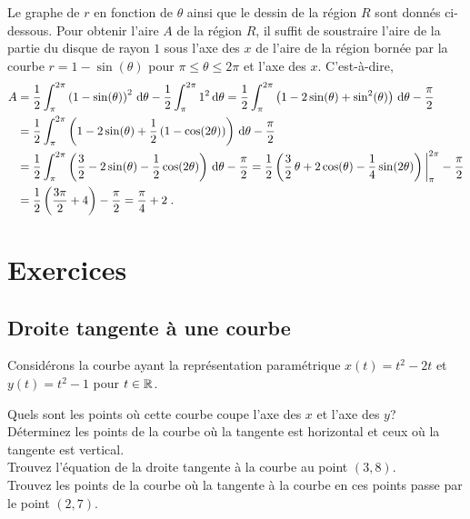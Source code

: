 {\begin{egg}
Le graphe de $r$ en fonction de $\theta$ ainsi que le dessin de la
région $R$ sont donnés ci-dessous.
Pour obtenir l'aire $A$ de la région $R$, il suffit de soustraire
l'aire de la partie du disque de rayon $1$ sous l'axe des $x$ de
l'aire de la région bornée par la courbe $r=1-\sin(\theta)$ pour
$\pi \leq \theta \leq 2\pi$ et l'axe des $x$.  C'est-à-dire,
\begin{align*}
A &= \frac{1}{2} \int_\pi^{2\pi} \left(1-\sin(\theta)\right)^2 \,\mathrm{d}\theta
- \frac{1}{2} \int_\pi^{2\pi} 1^2 \,\mathrm{d}\theta
= \frac{1}{2} \int_\pi^{2\pi} \left(1-2\sin(\theta)+\sin^2(\theta)\right)
\,\mathrm{d}\theta - \frac{\pi}{2} \\
&= \frac{1}{2} \int_\pi^{2\pi} \left(1-2\sin(\theta)+
\frac{1}{2}\left(1-\cos(2\theta)\right)\right) \,\mathrm{d}\theta - \frac{\pi}{2} \\
&= \frac{1}{2} \int_\pi^{2\pi} \left(\frac{3}{2} - 2\sin(\theta) -
\frac{1}{2}\cos(2\theta)\right) \,\mathrm{d}\theta - \frac{\pi}{2}
= \frac{1}{2}\left( \frac{3}{2}\,\theta + 2\cos(\theta) - \frac{1}{4}
\sin(2\theta)\right)\bigg|_\pi^{2\pi}  - \frac{\pi}{2} \\
&= \frac{1}{2} \left(\frac{3\pi}{2} + 4 \right) - \frac{\pi}{2}
= \frac{\pi}{4} + 2 \; .
\end{align*}
\end{egg}

}  %

\section{Exercices}

\subsection{Droite tangente à une courbe}

\begin{question}
Considérons la courbe ayant la représentation paramétrique
$x(t) = t^2 -2t$ et $y(t) = t^2 - 1$ pour $t \in \mathbb{R}$.

 Quels sont les points où cette courbe coupe l'axe des $x$ et
l'axe des $y$?\\
 Déterminez les points de la courbe où la tangente est
horizontal et ceux où la tangente est vertical.\\
 Trouvez l'équation de la droite tangente à la courbe au point
$(3,8)$.\\
 Trouvez les points de la courbe où la tangente à la
courbe en ces points passe par le point $(2,7)$.
\label{13Q1}
\end{question}

